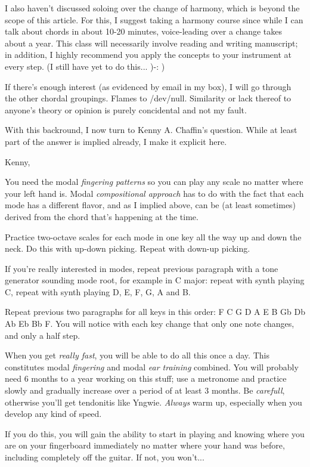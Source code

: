 I also haven't discussed soloing over the change of harmony, which is beyond
the scope of this article. For this, I suggest taking a harmony course since
while I can talk about chords in about 10-20 minutes, voice-leading over a
change takes about a year. This class will necessarily involve reading and
writing manuscript; in addition, I highly recommend you apply the concepts
to your instrument at every step. (I still have yet to do this... )-: )

If there's enough interest (as evidenced by email in my box), I will go through
the other chordal groupings. Flames to /dev/null. Similarity or lack thereof
to anyone's theory or opinion is purely concidental and not my fault.

With this backround, I now turn to Kenny A. Chaffin's question. While at least
part of the answer is implied already, I make it explicit here.

Kenny,

You need the modal \emph{fingering patterns} so you can play any scale no matter
where your left hand is. Modal \emph{compositional approach} has to do with the
fact that each mode has a different flavor, and as I implied above, can be
(at least sometimes) derived from the chord that's happening at the time.

Practice two-octave scales for each mode in one key all the way up and down
the neck. Do this with up-down picking. Repeat with down-up picking.

If you're really interested in modes, repeat previous paragraph with
a tone generator sounding mode root, for example in C major: repeat with
synth playing C, repeat with synth playing D, E, F, G, A and B.

Repeat previous two paragraphs for all keys in this order: F C G D A
E B Gb Db Ab Eb Bb F. You will notice with each key change that only one note
changes, and only a half step.

When you get \emph{really fast}, you will be able to do all this once a day.
This constitutes modal \emph{fingering} and modal \emph{ear training} combined.
You will probably need 6 months to a year working on this stuff; use
a metronome and practice slowly and gradually increase over a period
of at least 3 months. Be \emph{carefull}, otherwise you'll get tendonitis
like Yngwie. \emph{Always} warm up, especially when you develop any kind of
speed.

If you do this, you will gain the ability to start in playing and knowing
where you are on your fingerboard immediately no matter where your hand
was before, including completely off the guitar. If not, you won't...

